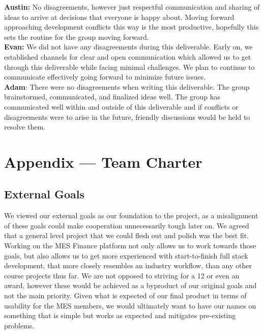 \documentclass{article}
\begin{document}
\begin{enumerate}
  \textbf{Austin:} No disagreements, however just respectful communication and sharing of ideas to arrive at decisions that everyone is happy about. Moving forward approaching development conflicts this way is the most productive, hopefully this sets the routine for the group moving forward.\\

  \textbf{Evan:} We did not have any disagreements during this deliverable. Early on, we established channels for clear and open communication which allowed us to get through this deliverable while facing minimal challenges. We plan to continue to communicate effectively going forward to minimize future issues. \\

  \textbf{Adam}: There were no disagreements when writing this deliverable. The group brainstormed, communicated, and finalized ideas well. The group has communicated well within and outside of this deliverable and if conflicts or disagreements were to arise in the future, friendly discussions would be held to resolve them.
  
\end{enumerate}

\newpage{}

\section*{Appendix --- Team Charter}


\subsection*{External Goals}

We viewed our external goals as our foundation to the project, as a misalignment of these goals could make cooperation unnecessarily tough later on. We agreed that a general level project that we could flesh out and polish was the best fit. Working on the MES Finance platform not only allows us to work towards those goals, but also allows us to get more experienced with start-to-finish full stack development, 
that more closely resembles an industry workflow, than any other course projects thus far. We are not opposed to striving for a 12 or even an award, however these would be achieved as a byproduct of our original goals and not the main priority. Given what is expected of our final product in terms of usability for the MES members, we would ultimately want to have our names on something that is simple but works as expected and mitigates pre-existing problems. 
\end{document}
